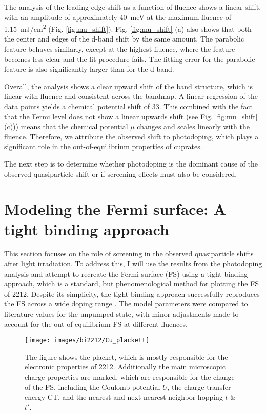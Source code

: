 The analysis of the leading edge shift as a function of fluence shows a linear shift, with an amplitude of approximately \qty{40}{\milli\electronvolt} at the maximum fluence of \qty{1.15}{\milli\joule/\centi\meter\squared} (Fig. \ref{fig:mu_shift}).
Fig. \ref{fig:mu_shift} (a) also shows that both the center and edges of the  d-band shift by the same amount.
The parabolic feature behaves similarly, except at the highest fluence, where the feature becomes less clear and the fit procedure fails.
The fitting error for the parabolic feature is also significantly larger than for the  d-band.

Overall, the analysis shows a clear upward shift of the band structure, which is linear with fluence and consistent across the bandmap.
A linear regression of the data points yields a chemical potential shift of \qty{33}{\frac{\milli\electronvolt}{\milli\joule/\centi\meter\squared}}.
This combined with the fact that the Fermi level does not show a linear upwards shift (see Fig. \ref{fig:mu_shift} (c))) means that the chemical potential $\mu$ changes and scales linearly with the fluence.
Therefore, we attribute the observed shift to photodoping, which plays a significant role in the out-of-equilibrium properties of cuprates.

The next step is to determine whether photodoping is the dominant cause of the observed quasiparticle shift or if screening effects must also be considered.

\section{Modeling the Fermi surface: A tight binding approach}
\label{sec:tb}

This section focuses on the role of screening in the observed quasiparticle shifts after light irradiation.
To address this, I will use the results from the photodoping analysis and attempt to recreate the Fermi surface (FS) using a tight binding approach, which is a standard, but phenomenological method for plotting the FS of 2212.
Despite its simplicity, the tight binding approach successfully reproduces the FS across a wide doping range \cite{markiewicz_one-band_2005}.
The model parameters were compared to literature values for the unpumped state, with minor adjustments made to account for the out-of-equilibrium FS at different fluences.

\begin{figure}
	\centering
	\texttt{[image: images/bi2212/Cu\_plackett]}
	\caption{The figure shows the  placket, which is mostly responsible for the electronic properties of 2212. Additionally the main microscopic charge properties are marked, which are responsible for the change of the FS, including the Coulomb potential $U$, the charge transfer energy CT, and the nearest and next nearest neighbor hopping $t$ \& $t'$.}
	\label{fig:cuplackett}
\end{figure}

